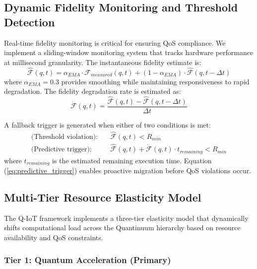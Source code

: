 \documentclass[lettersize,journal]{IEEEtran}
\begin{document}
\subsection{Dynamic Fidelity Monitoring and Threshold Detection}
\label{subsec:fidelity_monitoring}

Real-time fidelity monitoring is critical for ensuring QoS compliance. We implement a sliding-window monitoring system that tracks hardware performance at millisecond granularity. The instantaneous fidelity estimate is:
\begin{equation}
\hat{\mathcal{F}}(q, t) = \alpha_{EMA} \cdot \mathcal{F}_{measured}(q, t) + (1 - \alpha_{EMA}) \cdot \hat{\mathcal{F}}(q, t - \Delta t)
\label{eq:fidelity_ema}
\end{equation}
where $\alpha_{EMA} = 0.3$ provides smoothing while maintaining responsiveness to rapid degradation. The fidelity degradation rate is estimated as:
\begin{equation}
\dot{\mathcal{F}}(q, t) = \frac{\hat{\mathcal{F}}(q, t) - \hat{\mathcal{F}}(q, t - \Delta t)}{\Delta t}
\label{eq:fidelity_rate}
\end{equation}

A fallback trigger is generated when either of two conditions is met:
\begin{subequations}
\label{eq:fallback_conditions}
\begin{align}
\text{(Threshold violation):} \quad & \hat{\mathcal{F}}(q, t) < R_{min} \label{eq:threshold_violation}\\
\text{(Predictive trigger):} \quad & \hat{\mathcal{F}}(q, t) + \dot{\mathcal{F}}(q, t) \cdot t_{remaining} < R_{min} \label{eq:predictive_trigger}
\end{align}
\end{subequations}
where $t_{remaining}$ is the estimated remaining execution time. Equation (\ref{eq:predictive_trigger}) enables proactive migration before QoS violations occur.

\subsection{Multi-Tier Resource Elasticity Model}
\label{subsec:elasticity_model}

The Q-IoT framework implements a three-tier elasticity model that dynamically shifts computational load across the Quantinuum hierarchy based on resource availability and QoS constraints.

\subsubsection{Tier 1: Quantum Acceleration (Primary)}
\end{document}
